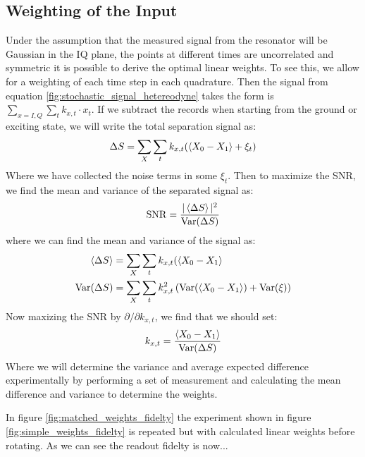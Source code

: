 \subsection{Weighting of the Input}
Under the assumption that the measured signal from the resonator will be Gaussian in the IQ plane, the points at different times are uncorrelated and symmetric   it is possible to derive the optimal linear weights. To see this, we allow for a weighting of each time step in each quadrature. Then the signal from equation \ref{fig:stochastic_signal_hetereodyne} takes the form is $\sum_{x = I, Q}\sum_t k_{x, t} \cdot x_t$. If we subtract the records when starting from the ground or exciting state, we will write the total separation signal as:
\begin{equation}
    \Delta S = \sum_X \sum_t k_{x, t} (\expval{X_0 - X_1} + \xi_t)
\end{equation}
Where we have collected the noise terms in some $\xi_t$. Then to maximize the SNR, we find the mean and variance of the separated signal as:
\begin{equation}
    \operatorname{SNR} = \frac{|\expval{\Delta S}|^2}{\operatorname{Var}(\Delta S)} 
\end{equation}
where we can find the mean and variance of the signal as:
\begin{align}
    \expval{\Delta S} &= \sum_X \sum_t k_{x, t} (\expval{X_0 - X_1} \\
    \operatorname{Var}(\Delta S) &= \sum_X \sum_t k_{x, t}^2 \left( \operatorname{Var}(\expval{X_0 - X_1}) + \operatorname{Var}(\xi) \right)
\end{align}
Now maxizing the SNR by $\partial / \partial k_{x, t}$, we find that we should set:
\begin{equation}
    k_{x, t} = \frac{\expval{X_0 - X_1}}{\operatorname{Var}(\Delta S)}
\end{equation}
Where we will determine the variance and average expected difference experimentally by performing a set of measurement and calculating the mean difference and variance to determine the weights. 

In figure \ref{fig:matched_weights_fidelty} the experiment shown in figure \ref{fig:simple_weights_fidelty} is repeated but with calculated linear weights before rotating. As we can see the readout fidelty is now... 

